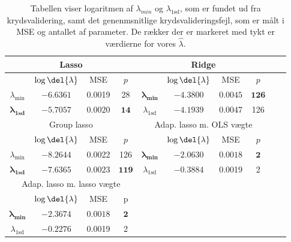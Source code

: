\begin{table}[ht]
\center
\begin{tabular}{cccc | cccccc}
\toprule
   \multicolumn{4}{c}{Lasso} &  \multicolumn{4}{c}{Ridge}  \\ \midrule
 & \(\log \del{\lambda}\) & MSE & $p$ & & \(\log \del{\lambda}\) & MSE & $p$ \\
 $\lambda_{\min}$ &$-6.6361$& 0.0019 & 28 &	$\boldsymbol{\lambda_{\min}}$ &  $\mathbf{-4.3800}$ &   $\mathbf{0.0045} $&  $\mathbf{126}$ \\ 
 $\boldsymbol{\lambda}_{\textbf{1sd}}$ & $\mathbf{-5.7057}$ & $\mathbf{0.0020} $& $\mathbf{14}$ & $\lambda_{ \text{1sd}}$& $-4.1939$ & 0.0047 & 126  \\ \bottomrule \toprule
\multicolumn{4}{c}{Group lasso}  &  \multicolumn{4}{c}{Adap. lasso m. OLS vægte}  \\ \midrule
& \(\log \del{\lambda}\) & MSE &$ p $ && \(\log \del{\lambda}\) & MSE & $p$ &  \\
$\lambda_{\min}$& $-8.2644$ & 0.0022  & 126 & $\boldsymbol{\lambda_{\min}}$  & $\mathbf{-2.0630}$ &$ \mathbf{0.0018}$ & $\mathbf{2}$ \\
  $\boldsymbol{\lambda}_{\textbf{1sd}}$  & $\mathbf{-7.6365}$ &$ \mathbf{0.0023}$ & $\mathbf{119}$ &  $\lambda_{1\text{sd}}$ & $-0.3884$ & 0.0019 & 2 \\  \bottomrule 
  \toprule
  \multicolumn{4}{c}{Adap. lasso m. lasso vægte}  \\ \cmidrule{1-4}
& \(\log \del{\lambda}\) & MSE & p \\
$\boldsymbol{\lambda_{\min}}$   &  $ \mathbf{-2.3674}$ & $ \mathbf{0.0018} $& $ \mathbf{2}$   \\
$\lambda_{1\text{sd}}$  & $-0.2276$ & 0.0019 & 2  \\ \cmidrule{1-4}
 \end{tabular}
\caption{Tabellen viser logaritmen af $\lambda_{min}$ og $\lambda_{1\text{sd}}$, som er  fundet ud fra krydsvalidering, samt det genenmsnitlige krydsvalideringsfejl, som er målt i MSE og antallet af parameter. De rækker der er markeret med tykt er værdierne for vores $\widehat{\lambda}$.} \label{tab:cv_tab}
\end{table}
